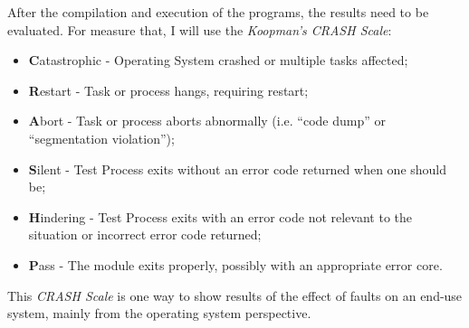 
After the compilation and execution of the programs, the results need to be evaluated. For measure that, I will use the \textit{Koopman's CRASH Scale}\cite{koopman1997comparing}:

\begin{itemize}
	\item \textbf{C}atastrophic - Operating System crashed or multiple tasks affected;
	\item \textbf{R}estart - Task or process hangs, requiring restart;
	\item \textbf{A}bort - Task or process aborts abnormally (i.e. ``code dump'' or ``segmentation violation'');
	\item \textbf{S}ilent - Test Process exits without an error code returned when one should be;
	\item \textbf{H}indering - Test Process exits with an error code not relevant to the situation or incorrect error code returned;
	\item \textbf{P}ass - The module exits properly, possibly with an appropriate error core.
\end{itemize}

This \textit{CRASH Scale} is one way to show results of the effect of faults on an end-use system, mainly from the operating system perspective.